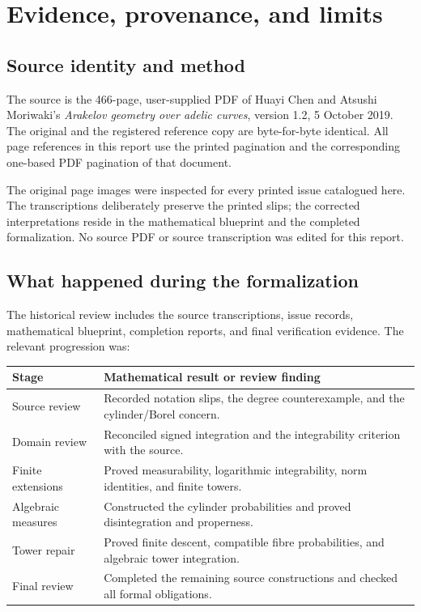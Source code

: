 \documentclass[10pt,a4paper]{article}
\begin{document}
\newpage
\section{Evidence, provenance, and limits}\label{evidence}

\subsection{Source identity and method}
The source is the 466-page, user-supplied PDF of Huayi Chen and Atsushi
Moriwaki's \emph{Arakelov geometry over adelic curves}, version 1.2,
5 October 2019. The original and the registered reference copy are
byte-for-byte identical. All page references in this report use the
printed pagination and the corresponding one-based PDF pagination
of that document.

The original page images were inspected for every printed issue catalogued
here. The transcriptions deliberately preserve the printed slips;
the corrected interpretations reside in the mathematical blueprint and
the completed formalization.
No source PDF or source transcription was edited for this report.

\subsection{What happened during the formalization}
The historical review includes the source transcriptions, issue records,
mathematical blueprint, completion reports, and final verification
evidence. The relevant progression was:
\begin{center}
\small
\begin{tabularx}{\linewidth}{@{}lX@{}}
\toprule
Stage & Mathematical result or review finding\\
\midrule
Source review & Recorded notation slips, the degree counterexample, and the cylinder/Borel concern.\\
Domain review & Reconciled signed integration and the integrability criterion with the source.\\
Finite extensions & Proved measurability, logarithmic integrability, norm identities, and finite towers.\\
Algebraic measures & Constructed the cylinder probabilities and proved disintegration and properness.\\
Tower repair & Proved finite descent, compatible fibre probabilities, and algebraic tower integration.\\
Final review & Completed the remaining source constructions and checked all formal obligations.\\
\bottomrule
\end{tabularx}
\end{center}
\end{document}

